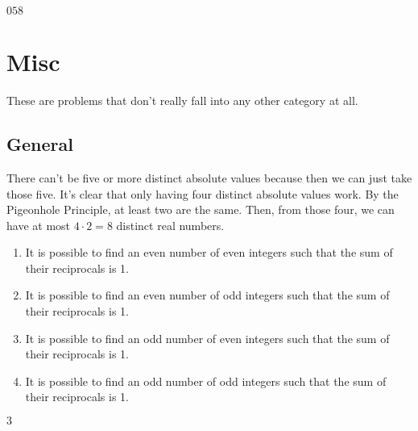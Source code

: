 \documentclass[11pt]{article}
\begin{document}
\begin{sol}
$\boxed{058}$
\end{sol}
\setcounter{problem}{0}

\section{Misc}
These are problems that don't really fall into any other category at all.

\subsection{General}

\begin{sol}
There can't be five or more distinct absolute values because then we can just take those five. It's clear that only having four distinct absolute values work. By the Pigeonhole Principle, at least two are the same. Then, from those four, we can have at most $4\cdot 2=\boxed{8}$ distinct real numbers.
\end{sol}


\begin{enumerate}
	\item It is possible to find an even number of even integers such that the sum of their reciprocals is 1.

	\item It is possible to find an even number of odd integers such that the sum of their reciprocals is 1.

	\item It is possible to find an odd number of even integers such that the sum of their reciprocals is 1.
	
	\item It is possible to find an odd number of odd integers such that the sum of their reciprocals is 1.
\end{enumerate}

\begin{sol}
$\boxed{3}$
\end{sol}
\end{document}
